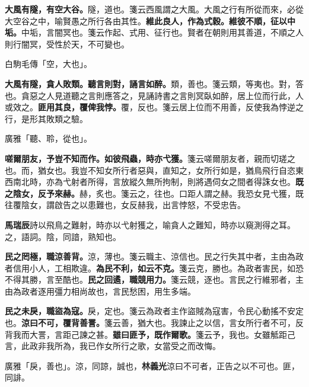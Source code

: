 \textbf{大風有隧，有空大谷。}{\footnotesize 隧，道也。箋云西風謂之大風。大風之行有所從而來，必從大空谷之中，喻賢愚之所行各由其性。}\textbf{維此良人，作為式穀。維彼不順，征以中垢。}{\footnotesize 中垢，言闇冥也。箋云作起、式用、征行也。賢者在朝則用其善道，不順之人則行闇冥，受性於天，不可變也。}

\begin{quoting}白駒毛傳「空，大也」。\end{quoting}

\textbf{大風有隧，貪人敗類。聽言則對，誦言如醉。}{\footnotesize 類，善也。箋云類，等夷也。對，答也。貪惡之人見道聽之言則應答之，見誦詩書之言則冥臥如醉，居上位而行此，人或效之。}\textbf{匪用其良，覆俾我悖。}{\footnotesize 覆，反也。箋云居上位而不用善，反使我為悖逆之行，是形其敗類之驗。}

\begin{quoting}廣雅「聽、聆，從也」。\end{quoting}

\textbf{嗟爾朋友，予豈不知而作。如彼飛蟲，時亦弋獲。}{\footnotesize 箋云嗟爾朋友者，親而切瑳之也。而，猶女也。我豈不知女所行者惡與，直知之，女所行如是，猶鳥飛行自恣東西南北時，亦為弋射者所得，言放縱久無所拘制，則將遇伺女之間者得誅女也。}\textbf{既之陰女，反予來赫。}{\footnotesize 赫，炙也。箋云之，往也。口距人謂之赫。我恐女見弋獲，既往覆陰女，謂啟告之以患難也，女反赫我，出言悖怒，不受忠告。}

\begin{quoting}\textbf{馬瑞辰}詩以飛鳥之難射，時亦以弋射獲之，喻貪人之難知，時亦以窺測得之耳。之，語詞。陰，同諳，熟知也。\end{quoting}

\textbf{民之罔極，職涼善背。}{\footnotesize 涼，薄也。箋云職主、涼信也。民之行失其中者，主由為政者信用小人，工相欺違。}\textbf{為民不利，如云不克。}{\footnotesize 箋云克，勝也。為政者害民，如恐不得其勝，言至酷也。}\textbf{民之回遹，職競用力。}{\footnotesize 箋云競，逐也。言民之行維邪者，主由為政者逐用彊力相尚故也，言民愁困，用生多端。}

\textbf{民之未戾，職盜為寇。}{\footnotesize 戾，定也。箋云為政者主作盜賊為寇害，令民心動搖不安定也。}\textbf{涼曰不可，覆背善詈。}{\footnotesize 箋云善，猶大也。我諫止之以信，言女所行者不可，反背我而大詈，言距己諫之甚。}\textbf{雖曰匪予，既作爾歌。}{\footnotesize 箋云予，我也。女雖觝距己言，此政非我所為，我已作女所行之歌，女當受之而改悔。}

\begin{quoting}廣雅「戾，善也」。涼，同諒，誠也，\textbf{林義光}涼曰不可者，正告之以不可也。匪，同誹。\end{quoting}

